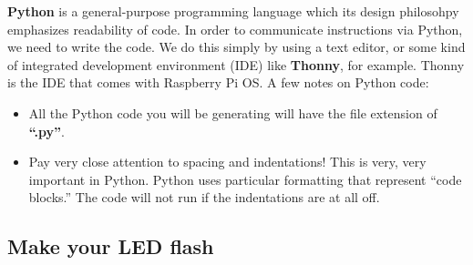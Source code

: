 \documentclass{article}\usepackage[]{graphicx}\usepackage[]{color}
\begin{document}
\textbf{Python} is a general-purpose programming language which its design philosohpy emphasizes readability of code.
\newline
\newline
In order to communicate instructions via Python, we need to write the code. We do this simply by using a text editor, or some kind of integrated development environment (IDE) like \textbf{Thonny}, for example. Thonny is the IDE that comes with Raspberry Pi OS.
\newline
\newline
A few notes on Python code:

\begin{itemize}
\item All the Python code you will be generating will have the file extension of \textbf{``.py''}.
\item Pay very close attention to spacing and indentations! This is very, very important in Python. Python uses particular formatting that represent ``code blocks.'' The code will not run if the indentations are at all off.
\end{itemize}

\subsection{Make your LED flash}
\end{document}
